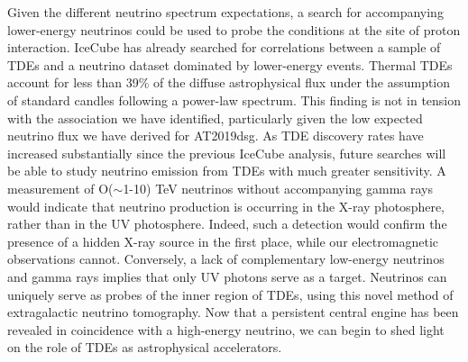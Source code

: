 Given the different neutrino spectrum expectations, a search for accompanying lower-energy neutrinos could be used to probe the conditions at the site of proton interaction. IceCube has already searched for correlations between a sample of TDEs and a neutrino dataset dominated by lower-energy events\cite{2019ICRC...36.1016S}. Thermal TDEs account for less than 39\% of the diffuse astrophysical flux under the assumption of standard candles following a power-law spectrum. This finding is not in tension with the association we have identified, particularly given the low expected neutrino flux we have derived for AT2019dsg. As TDE discovery rates have increased substantially since the previous IceCube analysis\cite{van_velzen_20, 2019ICRC...36.1016S}, future searches will be able to study neutrino emission from TDEs with much greater sensitivity. A measurement of O($\sim$1-10) TeV neutrinos without accompanying gamma rays would indicate that neutrino production is occurring in the X-ray photosphere, rather than in the UV photosphere. Indeed, such a detection would confirm the presence of a hidden X-ray source in the first place, while our electromagnetic observations cannot. Conversely, a lack of complementary low-energy neutrinos and gamma rays implies that only UV photons serve as a target. Neutrinos can uniquely serve as probes of the inner region of TDEs, using this novel method of extragalactic neutrino tomography. Now that a persistent central engine has been revealed in coincidence with a high-energy neutrino, we can begin to shed light on the role of TDEs as astrophysical accelerators.